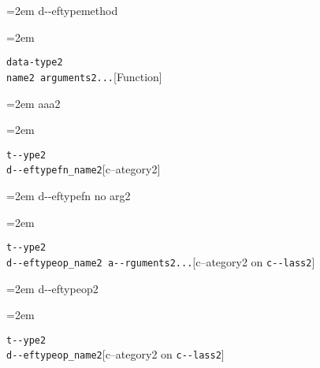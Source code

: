\documentclass{book}
\begin{document}
%
\par\begingroup\obeylines\obeyspaces\frenchspacing\leftskip=2em\relax\parskip=0pt\relax\ttfamily{}%
d{-}{-}eftypemethod
\endgroup{}%
\par\begingroup\obeylines\obeyspaces\frenchspacing\leftskip=2em\relax\parskip=0pt\relax\ttfamily{}%


\endgroup{}%
\noindent\texttt{data-type2\leavevmode{}\\name2 arguments2...}\hfill[Function]



%
\par\begingroup\obeylines\obeyspaces\frenchspacing\leftskip=2em\relax\parskip=0pt\relax\ttfamily{}%
aaa2
\endgroup{}%
\par\begingroup\obeylines\obeyspaces\frenchspacing\leftskip=2em\relax\parskip=0pt\relax\ttfamily{}%

\endgroup{}%
\noindent\texttt{t{-}{-}ype2\leavevmode{}\\d{-}{-}eftypefn\_name2}\hfill[c--ategory2]



%
\par\begingroup\obeylines\obeyspaces\frenchspacing\leftskip=2em\relax\parskip=0pt\relax\ttfamily{}%
d{-}{-}eftypefn no arg2
\endgroup{}%
\par\begingroup\obeylines\obeyspaces\frenchspacing\leftskip=2em\relax\parskip=0pt\relax\ttfamily{}%

\endgroup{}%
\noindent\texttt{t{-}{-}ype2\leavevmode{}\\d{-}{-}eftypeop\_name2 a{-}{-}rguments2...}\hfill[c--ategory2 on \texttt{c{-}{-}lass2}]



%
\par\begingroup\obeylines\obeyspaces\frenchspacing\leftskip=2em\relax\parskip=0pt\relax\ttfamily{}%
d{-}{-}eftypeop2
\endgroup{}%
\par\begingroup\obeylines\obeyspaces\frenchspacing\leftskip=2em\relax\parskip=0pt\relax\ttfamily{}%

\endgroup{}%
\noindent\texttt{t{-}{-}ype2\leavevmode{}\\d{-}{-}eftypeop\_name2}\hfill[c--ategory2 on \texttt{c{-}{-}lass2}]
\end{document}

